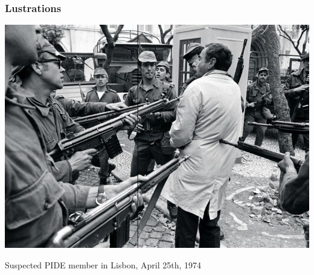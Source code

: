 \documentclass[aspectratio=43]{beamer}
\begin{document}
\begin{frame}
\frametitle{Lustrations}
\centering

\includegraphics[width = \textwidth]{img/pide}

Suspected PIDE member in Lisbon, April 25th, 1974

\end{frame}



\end{document}
